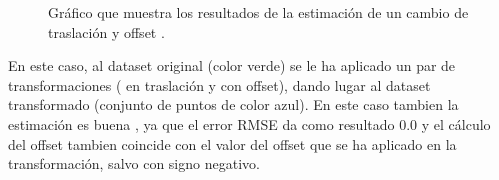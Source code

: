\begin{figure}
\begin{center}
\hspace{0.5cm}

\end{center}

\caption{Gráfico que muestra los resultados de la estimación de un cambio de traslación y offset .}
\end{figure}
En este caso, al dataset original (color verde) se le ha aplicado un par de transformaciones ( en traslación y con offset), dando lugar al dataset transformado (conjunto de puntos de color azul). En este caso tambien la estimación es buena , ya que el error RMSE da como resultado 0.0 y el cálculo del offset tambien coincide con el valor del offset que se ha aplicado en la transformación, salvo con signo negativo.


